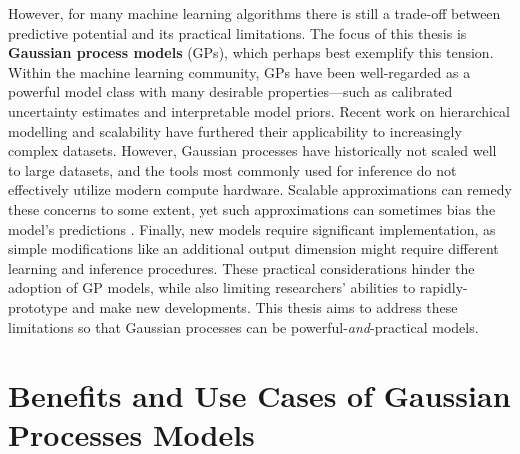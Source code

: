 However, for many machine learning algorithms there is still a trade-off between predictive potential and its practical limitations.
The focus of this thesis is {\bf Gaussian process models} (GPs), which perhaps best exemplify this tension.
Within the machine learning community, GPs have been well-regarded as a powerful model class with many desirable properties---such as calibrated uncertainty estimates and interpretable model priors.
Recent work on hierarchical modelling \citep[e.g.][]{damianou2013deep} and scalability \citep[e.g.][]{wilson2015kernel} have furthered their applicability to increasingly complex datasets.
However, Gaussian processes have historically not scaled well to large datasets, and the tools most commonly used for inference do not effectively utilize modern compute hardware.
Scalable approximations can remedy these concerns to some extent, yet such approximations can sometimes bias the model's predictions \cite{turner2011two,bauer2016understanding}.
Finally, new models require significant implementation, as simple modifications like an additional output dimension might require different learning and inference procedures.
These practical considerations hinder the adoption of GP models, while also limiting researchers' abilities to rapidly-prototype and make new developments.
This thesis aims to address these limitations so that Gaussian processes can be powerful-\emph{and}-practical models.


\section{Benefits and Use Cases of Gaussian Processes Models}

